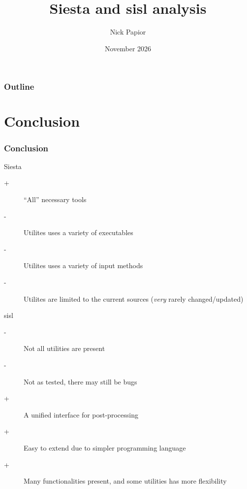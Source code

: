 

\graphicspath{{fig/}}


\date{November 2026}
\title{Siesta and sisl analysis}
\author{Nick Papior}



\begin{frame}
  \titlepage
\end{frame}

\begin{frame}
  \frametitle{Outline}
  \tableofcontents
\end{frame}



\section{Conclusion}

\begin{frame}
  \frametitle{Conclusion}

  \begin{block}{Siesta}
    \begin{description}
      \item[+] ``All'' necessary tools
      \item[-] Utilites uses a variety of executables
      \item[-] Utilites uses a variety of input methods
      \item[-] Utilites are limited to the current sources (\emph{very} rarely changed/updated)
    \end{description}
  \end{block}

  \begin{block}{sisl}
    \begin{description}
      \item[-] Not all utilities are present
      \item[-] Not as tested, there may still be bugs
      \item[+] A unified interface for post-processing
      \item[+] Easy to extend due to simpler programming language
      \item[+] Many functionalities present, and some utilities has more flexibility
    \end{description}
  \end{block}

\end{frame}


